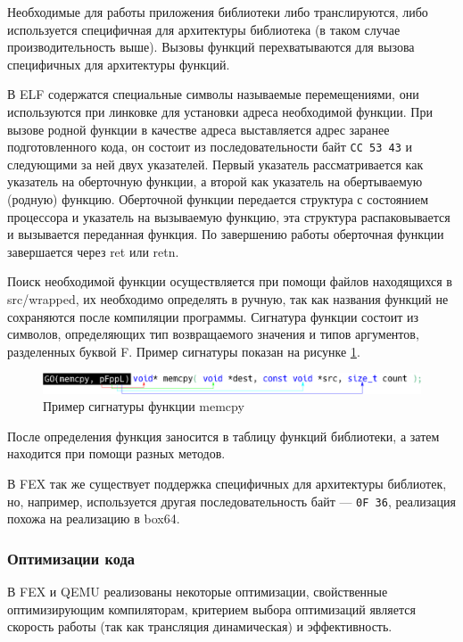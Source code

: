 Необходимые для работы приложения библиотеки либо транслируются, либо используется специфичная для архитектуры библиотека (в таком случае производительность выше). Вызовы функций перехватываются для вызова специфичных для архитектуры функций. 

В ELF содержатся специальные символы называемые перемещениями, они используются при линковке для установки адреса необходимой функции. При вызове родной функции в качестве адреса выставляется адрес заранее подготовленного кода, он состоит из последовательности байт \texttt{CC 53 43} и следующими за ней двух указателей. Первый указатель рассматривается как указатель на оберточную функции, а второй как указатель на обертываемую (родную) функцию. Оберточной функции передается структура с состоянием процессора и указатель на вызываемую функцию, эта структура распаковывается и вызывается переданная функция. По завершению работы оберточная функции завершается через ret или retn.

Поиск необходимой функции осуществляется при помощи файлов находящихся в src/wrapped, их необходимо определять в ручную, так как названия функций не сохраняются после компиляции программы. Сигнатура функции состоит из символов, определяющих тип возвращаемого значения и типов аргументов, разделенных буквой F. Пример сигнатуры показан на рисунке \ref{fig:box64sig}.

\begin{figure}[hbtp]
	\centering
	\includegraphics[width=\textwidth]{img/function.eps}
	\caption{Пример сигнатуры функции memcpy}
	\label{fig:box64sig}
\end{figure}

После определения функция заносится в таблицу функций библиотеки, а затем находится при помощи разных методов. \cite{box64_deep}

В FEX так же существует поддержка специфичных для архитектуры библиотек, но, например, используется другая последовательность байт --- \texttt{0F 36}, реализация похожа на реализацию в box64.

\subsubsection{Оптимизации кода}

В FEX и QEMU реализованы некоторые оптимизации, свойственные оптимизирующим компиляторам, критерием выбора оптимизаций является скорость работы (так как трансляция динамическая) и эффективность.


